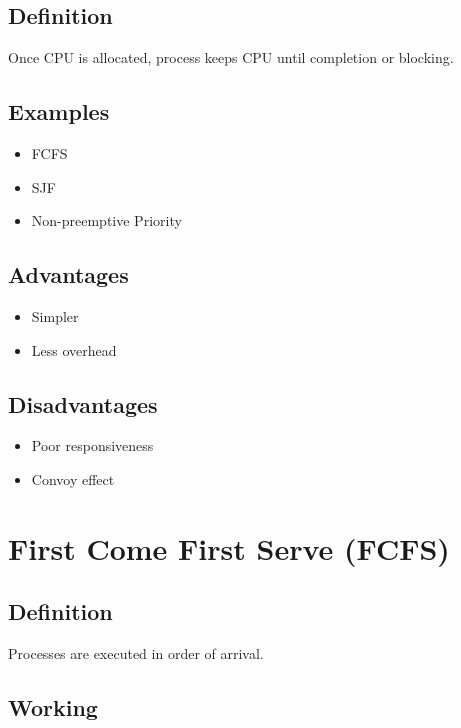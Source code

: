 \subsection{Definition}

Once CPU is allocated, process keeps CPU until completion or blocking.

\subsection{Examples}

\begin{itemize}
\item FCFS
\item SJF
\item Non-preemptive Priority
\end{itemize}

\subsection{Advantages}

\begin{itemize}
\item Simpler
\item Less overhead
\end{itemize}

\subsection{Disadvantages}

\begin{itemize}
\item Poor responsiveness
\item Convoy effect
\end{itemize}

\section{First Come First Serve (FCFS)}

\subsection{Definition}

Processes are executed in order of arrival.

\subsection{Working}

